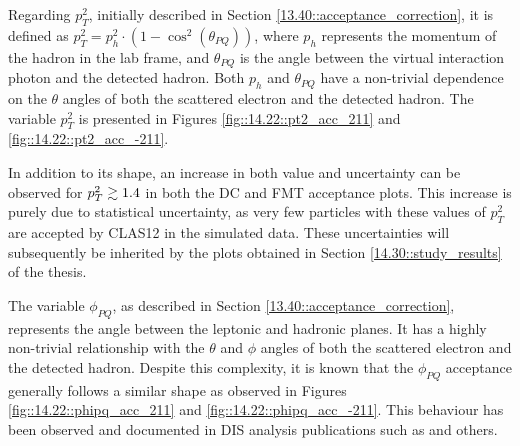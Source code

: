     Regarding $p_T^2$, initially described in Section \ref{13.40::acceptance_correction}, it is defined as $p_T^2 = p_h^2 \cdot \left(1 - \cos^2(\theta_{PQ})\right)$, where $p_h$ represents the momentum of the hadron in the lab frame, and $\theta_{PQ}$ is the angle between the virtual interaction photon and the detected hadron.
    Both $p_h$ and $\theta_{PQ}$ have a non-trivial dependence on the $\theta$ angles of both the scattered electron and the detected hadron.
    The variable $p_T^2$ is presented in Figures \ref{fig::14.22::pt2_acc_211} and \ref{fig::14.22::pt2_acc_-211}.

    In addition to its shape, an increase in both value and uncertainty can be observed for $p_T^2 \gtrsim 1.4$ in both the DC and FMT acceptance plots.
    This increase is purely due to statistical uncertainty, as very few particles with these values of $p_T^2$ are accepted by CLAS12 in the simulated data.
    These uncertainties will subsequently be inherited by the plots obtained in Section \ref{14.30::study_results} of the thesis.

    The variable $\phi_{PQ}$, as described in Section \ref{13.40::acceptance_correction}, represents the angle between the leptonic and hadronic planes.
    It has a highly non-trivial relationship with the $\theta$ and $\phi$ angles of both the scattered electron and the detected hadron.
    Despite this complexity, it is known that the $\phi_{PQ}$ acceptance generally follows a similar shape as observed in Figures \ref{fig::14.22::phipq_acc_211} and \ref{fig::14.22::phipq_acc_-211}.
    This behaviour has been observed and documented in DIS analysis publications such as \cite{moran2022} and others.

